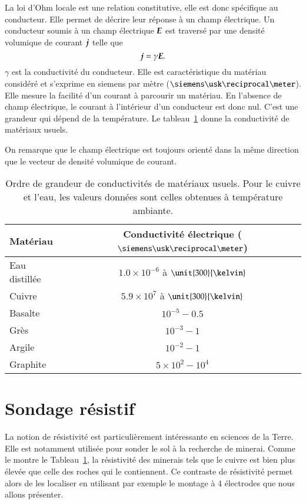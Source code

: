 \begin{defn}
	La loi d'Ohm locale est une relation constitutive, elle est donc spécifique
	au conducteur. Elle permet de décrire leur réponse à un champ électrique.
	Un conducteur soumis à un champ électrique $\vece$ est traversé
	par une densité volumique de courant $\vecj$ telle que 
	\begin{equation}
		\vecj = \gamma \vece.
	\end{equation}
	$\gamma$ est la conductivité du conducteur. Elle est caractéristique du
	matériau considéré et s'exprime en siemens par mètre ($\siemens \usk 
	\reciprocal \meter$). Elle mesure la facilité d'un courant à parcourir 
	un matériau. En l'absence de champ électrique, le courant à l'intérieur
	d'un conducteur est donc nul. C'est une grandeur qui dépend de la température. 
	Le tableau~\ref{tab:conductivite} donne la conductivité de matériaux usuels.
\end{defn}

\begin{rema}
	On remarque que le champ électrique est toujours orienté dans la même
	direction que le vecteur de densité volumique de courant.
\end{rema}

\begin{table}
	\centering
	\caption{Ordre de grandeur de conductivités de matériaux usuels. Pour le
		 cuivre et l'eau, les valeurs données sont celles obtenues 
	 	 à température ambiante.}
	\begin{tabular}{l|c}
		\textbf{Matériau} & \textbf{Conductivité électrique} 
		($\siemens \usk \reciprocal \meter$)\\ \hline
		Eau distillée 	 & $1.0 \times 10^{-6}$ à $\unit{300}{\kelvin}$ \\[0.5em]
		Cuivre   & $5.9 \times 10^7$ à $\unit{300}{\kelvin}$\\[0.5em]
		Basalte   & $10^{-5} - 0.5$ \\[0.5em]
		Grès     & $10^{-3} - 1$\\[0.5em]
		Argile   & $10^{-2} - 1$\\[0.5em]
		Graphite & $5 \times 10^{2} - 10^4$\\ \hline
	\end{tabular}
	\label{tab:conductivite}
\end{table}

\section{Sondage résistif}
La notion de résistivité est particulièrement intéressante en sciences de la 
Terre. Elle est notamment utilisée pour sonder le sol à la recherche de minerai.
Comme le montre le Tableau~\ref{tab:conductivite}, la résistivité des minerais tels que
le cuivre est bien plus élevée que celle des roches qui le contiennent. Ce contraste
de résistivité permet alors de les localiser en utilisant par exemple le montage
à 4 électrodes que nous allons présenter.


